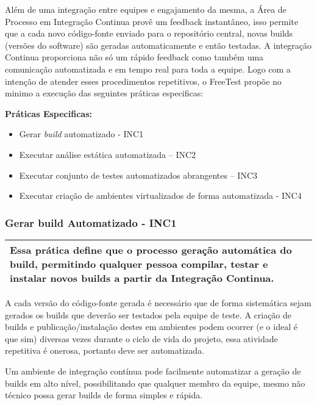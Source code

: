 Além de uma integração entre equipes e engajamento da mesma, a Área de Processo em Integração Continua provê um feedback instantâneo, isso permite que a cada novo código-fonte enviado para o repositório central, novas builds (versões do software) são geradas automaticamente e então testadas. A integração Continua proporciona não só um rápido feedback como também uma comunicação automatizada e em tempo real para toda a equipe. Logo com a intenção de atender esses procedimentos repetitivos, o FreeTest propõe no minimo a execução das seguintes práticas especificas:

\textbf{Práticas Especificas:}

\begin{itemize}    
    \item Gerar \textit{build} automatizado - INC1
    \item Executar análise estática automatizada – INC2
    \item Executar conjunto de testes automatizados abrangentes – INC3
    \item Executar criação de ambientes virtualizados de forma automatizada - INC4
\end{itemize}

\subsubsection{Gerar build Automatizado - INC1}
\label{sec:inc1}

\begin{table}[!ht]
\centering
\begin{tabular}{|p{130mm}|}
\hline
Essa prática define que o processo geração automática do build, permitindo qualquer pessoa compilar, testar e instalar novos builds a partir da Integração Continua. \\
\hline
\end{tabular}
\end{table}

A cada versão do código-fonte gerada é necessário que de forma sistemática sejam gerados os builds que deverão ser testados pela equipe de teste. A criação de builds e publicação/instalação destes em ambientes podem ocorrer (e o ideal é que sim) diversas vezes durante o ciclo de vida do projeto, essa atividade repetitiva é onerosa, portanto deve ser automatizada.

Um ambiente de integração contínua pode facilmente automatizar a geração de builds em alto nível, possibilitando que qualquer membro da equipe, mesmo não técnico possa gerar builds de forma simples e rápida.

